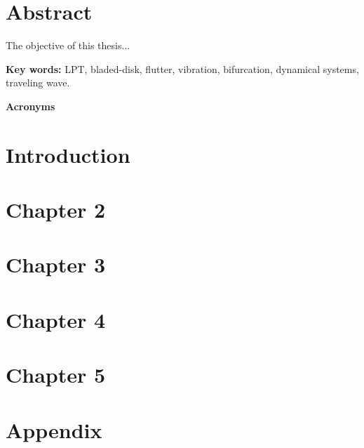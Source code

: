\documentclass[12pt, twoside, openright]{report}
\theoremstyle{definition}
\numberwithin{equation}{chapter}
\begin{document}
\onehalfspacing



\chapter*{Abstract}
The objective of this thesis...

\textbf{Key words:} LPT, bladed-disk, flutter, vibration, bifurcation, dynamical systems, traveling wave.

\doublespacing	
\tableofcontents
\pagestyle{plain}

\listoffigures
\cleardoublepage
\thispagestyle{plain}

\listoftables
\cleardoublepage

\onehalfspacing
{}

\printnomenclature
\clearpage

\textbf{\Large
	{Acronyms}}

\begin{acronym}
\end{acronym}

\cleardoublepage

\pagestyle{fancy}
\setcounter{page}{1}
\onehalfspacing		

\chapter{Introduction}
\label{chap:intro}


\chapter{Chapter 2}
\label{chap:2}


\chapter{Chapter 3}
\label{chap:3}


\chapter{Chapter 4}
\label{chap:4}


\chapter{Chapter 5}
\label{chap:conclusiones}


\appendix
\chapter{Appendix}
\label{chap:apendice}


\nocite{*}

\end{document}
